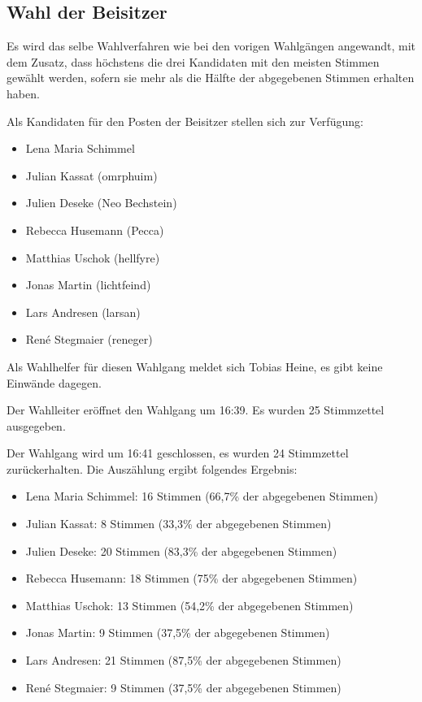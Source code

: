 \documentclass[a4paper,12pt]{scrartcl}
\begin{document}
\subsection{Wahl der Beisitzer}
Es wird das selbe Wahlverfahren wie bei den vorigen Wahlgängen angewandt, mit
dem Zusatz, dass höchstens die drei Kandidaten mit den meisten Stimmen gewählt
werden, sofern sie mehr als die Hälfte der abgegebenen Stimmen erhalten haben.

Als Kandidaten für den Posten der Beisitzer stellen sich zur Verfügung:
\begin{itemize}
  \item Lena Maria Schimmel
  \item Julian Kassat (omrphuim)
  \item Julien Deseke (Neo Bechstein)
  \item Rebecca Husemann (Pecca)
  \item Matthias Uschok (hellfyre)
  \item Jonas Martin (lichtfeind)
  \item Lars Andresen (larsan)
  \item René Stegmaier (reneger)
\end{itemize}

Als Wahlhelfer für diesen Wahlgang meldet sich Tobias Heine, es gibt keine
Einwände dagegen.

Der Wahlleiter eröffnet den Wahlgang um 16:39. Es wurden 25 Stimmzettel
ausgegeben.

Der Wahlgang wird um 16:41 geschlossen, es wurden 24 Stimmzettel zurückerhalten.
Die Auszählung ergibt folgendes Ergebnis:

\begin{itemize}
  \item Lena Maria Schimmel: 16 Stimmen (66{,}7\% der abgegebenen Stimmen)
  \item Julian Kassat: 8 Stimmen (33{,}3\% der abgegebenen Stimmen)
  \item Julien Deseke: 20 Stimmen (83{,}3\% der abgegebenen Stimmen)
  \item Rebecca Husemann: 18 Stimmen (75\% der abgegebenen Stimmen)
  \item Matthias Uschok: 13 Stimmen (54{,}2\% der abgegebenen Stimmen)
  \item Jonas Martin: 9 Stimmen (37{,}5\% der abgegebenen Stimmen)
  \item Lars Andresen: 21 Stimmen (87{,}5\% der abgegebenen Stimmen)
  \item René Stegmaier: 9 Stimmen (37{,}5\% der abgegebenen Stimmen)
\end{itemize}
\end{document}
